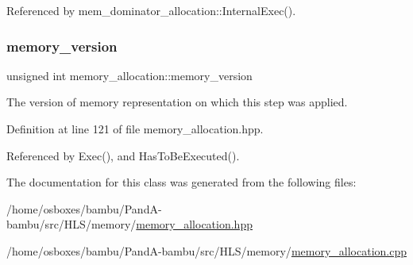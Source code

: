 Referenced by mem\+\_\+dominator\+\_\+allocation\+::\+Internal\+Exec().

\mbox{\label{classmemory__allocation_a6b44f510a470571378302da9dade4297}} 
\subsubsection{\texorpdfstring{memory\+\_\+version}{memory\_version}}
{\footnotesize\ttfamily unsigned int memory\+\_\+allocation\+::memory\+\_\+version\hspace{0.3cm}{\ttfamily [protected]}}



The version of memory representation on which this step was applied. 



Definition at line 121 of file memory\+\_\+allocation.\+hpp.



Referenced by Exec(), and Has\+To\+Be\+Executed().



The documentation for this class was generated from the following files\+:\begin{DoxyCompactItemize}
\item 
/home/osboxes/bambu/\+Pand\+A-\/bambu/src/\+H\+L\+S/memory/\hyperlink{memory__allocation_8hpp}{memory\+\_\+allocation.\+hpp}\item 
/home/osboxes/bambu/\+Pand\+A-\/bambu/src/\+H\+L\+S/memory/\hyperlink{memory__allocation_8cpp}{memory\+\_\+allocation.\+cpp}\end{DoxyCompactItemize}
